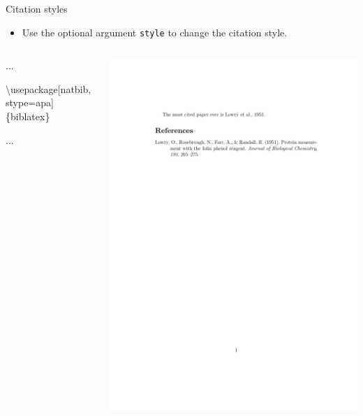 \documentclass[,aspectratio=43]{beamer}
\newenvironment{Shaded}{\begin{snugshade}}{\end{snugshade}}
\newcommand{\BuiltInTok}[1]{#1}
\newcommand{\ExtensionTok}[1]{#1}
\newcommand{\NormalTok}[1]{#1}
\providecommand{\tightlist}{%
  \setlength{\itemsep}{0pt}\setlength{\parskip}{0pt}}
\begin{document}
\begin{frame}[fragile]{Citation styles}
\protect\hypertarget{citation-styles}{}
\begin{itemize}
\tightlist
\item
  Use the optional argument \texttt{style} to change the citation style.
\end{itemize}

\begin{columns}[T]
\begin{column}{0.53\textwidth}
\small
\vspace{-1em}

\begin{Shaded}
\begin{Highlighting}[]
\NormalTok{...}

\BuiltInTok{\textbackslash{}usepackage}\NormalTok{[natbib,stype=apa]}
\NormalTok{  \{}\ExtensionTok{biblatex}\NormalTok{\} }

\NormalTok{...}
\end{Highlighting}
\end{Shaded}
\end{column}

\begin{column}{0.43\textwidth}
\vspace{-1em}

\begin{center}\includegraphics[width=1\linewidth]{figure/biblatex2} \end{center}
\end{column}
\end{columns}


\end{frame}
\end{document}
